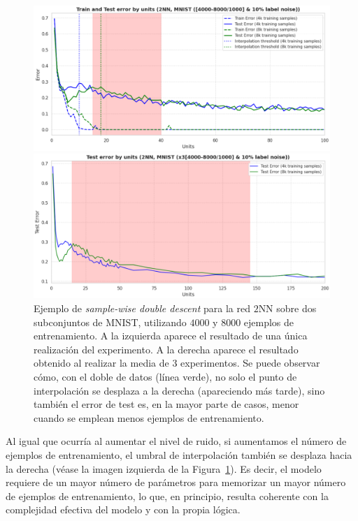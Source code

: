 \begin{figure}[h!]
    \centering
    \begin{minipage}{0.49\textwidth}
        \centering
        \includegraphics[width=\linewidth]{img/experiments/sample-wise-dd1.png}
    \end{minipage}
    \hfill
    \begin{minipage}{0.49\textwidth}
        \centering
        \includegraphics[width=\linewidth]{img/experiments/sample-wise-dd2.png}
    \end{minipage}
    \caption[Ejemplo de \textit{sample-wise double descent}.]{Ejemplo de \textit{sample-wise double descent} para la red $2$NN sobre dos subconjuntos de MNIST, utilizando $4000$ y $8000$ ejemplos de entrenamiento. A la izquierda aparece el resultado de una única realización del experimento. A la derecha aparece el resultado obtenido al realizar la media de $3$ experimentos. Se puede observar cómo, con el doble de datos (línea verde), no solo el punto de interpolación se desplaza a la derecha (apareciendo más tarde), sino también el error de test es, en la mayor parte de casos, menor cuando se emplean menos ejemplos de entrenamiento.}\label{fig:swdd}
\end{figure}

Al igual que ocurría al aumentar el nivel de ruido, si aumentamos el número de ejemplos de entrenamiento, el umbral de interpolación también se desplaza hacia la derecha (véase la imagen izquierda de la Figura~\ref{fig:swdd}). Es decir, el modelo requiere de un mayor número de parámetros para memorizar un mayor número de ejemplos de entrenamiento, lo que, en principio, resulta coherente con la complejidad efectiva del modelo y con la propia lógica.\newline

